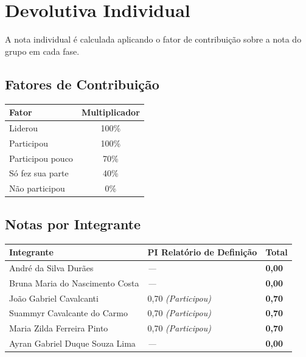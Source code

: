 \documentclass[
  sigconf,
  nonacm, %
  language=portuguese
]{acmart}
\begin{document}
\section{Devolutiva Individual}

A nota individual é calculada aplicando o fator de contribuição sobre a nota do grupo em cada fase.

\subsection{Fatores de Contribuição}

\begin{tabularx}{0.6\linewidth}{@{} X c @{}}
\toprule
\textbf{Fator} & \textbf{Multiplicador} \\
\midrule
Liderou & 100\% \\
Participou & 100\% \\
Participou pouco & 70\% \\
Só fez sua parte & 40\% \\
Não participou & 0\% \\
\bottomrule
\end{tabularx}

\vspace{1em}
\subsection{Notas por Integrante}

\begin{tabularx}{\linewidth}{@{} X X p{2.5cm} @{}}
\toprule
\textbf{Integrante} & \textbf{\small PI Relatório de Definição} & \textbf{Total} \\
\midrule
André da Silva Durães & \textit{---} & \textbf{0,00} \\
Bruna Maria do Nascimento Costa & \textit{---} & \textbf{0,00} \\
João Gabriel Cavalcanti & 0,70 \textit{(Participou)} & \textbf{0,70} \\
Suammyr Cavalcante do Carmo & 0,70 \textit{(Participou)} & \textbf{0,70} \\
Maria Zilda Ferreira Pinto & 0,70 \textit{(Participou)} & \textbf{0,70} \\
Ayran Gabriel Duque Souza Lima & \textit{---} & \textbf{0,00} \\
\bottomrule
\end{tabularx}
\end{document}
